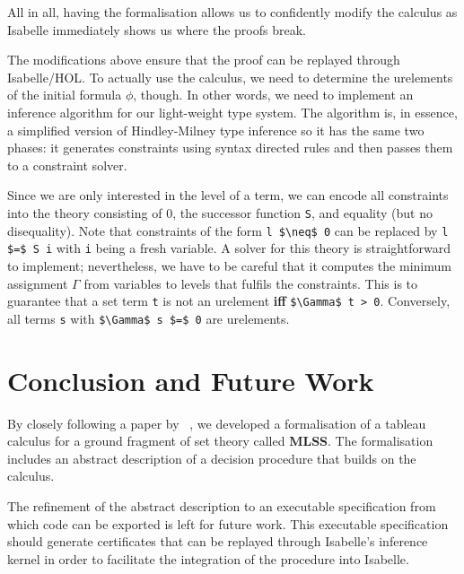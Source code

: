 \documentclass[runningheads]{llncs}
\newcommand{\MLSS}{\textbf{MLSS}}
\begin{document}
All in all, having the formalisation allows us to confidently modify the calculus as Isabelle immediately shows us where the proofs break.

The modifications above ensure that the proof can be replayed through Isabelle/HOL.
To actually use the calculus, we need to determine the urelements of the initial formula $\phi$, though.
In other words, we need to implement an inference algorithm for our light-weight type system.
The algorithm is, in essence, a simplified version of Hindley-Milney type inference so it has the same two phases:
it generates constraints using syntax directed rules and then passes them to a constraint solver.

Since we are only interested in the level of a term, we can encode all constraints into the theory consisting of $0$, the successor function \lstinline!S!, and equality (but no disequality).
Note that constraints of the form \lstinline!l $\neq$ 0! can be replaced by \lstinline!l $=$ S i! with \lstinline!i! being a fresh variable.
A solver for this theory is straightforward to implement;
nevertheless, we have to be careful that it computes the minimum assignment $\Gamma$ from variables to levels that fulfils the constraints. 
This is to guarantee that a set term \lstinline!t! is not an urelement \textbf{iff} \lstinline!$\Gamma$ t > 0!.
Conversely, all terms \lstinline!s! with \lstinline!$\Gamma$ s $=$ 0! are urelements.

\section{Conclusion and Future Work}
By closely following a paper by \citeauthor{new_fast_tableau}~\cite{new_fast_tableau}, we developed a formalisation of a tableau calculus for a ground fragment of set theory called \MLSS{}.
The formalisation includes an abstract description of a decision procedure that builds on the calculus.

The refinement of the abstract description to an executable specification from which code can be exported is left for future work.
This executable specification should generate certificates that can be replayed through Isabelle's inference kernel in order to facilitate the integration of the procedure into Isabelle.

\end{document}
